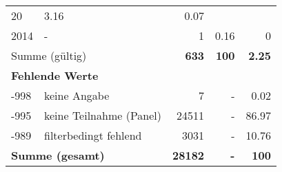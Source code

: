 \begin{longtable}{lXrrr}
       \num{20} &
       \num[round-mode=places,round-precision=2]{3.16} &
         \num[round-mode=places,round-precision=2]{0.07} \\

     2014 &
     \multicolumn{1}{X}{ -  } &


       \num{1} &
       \num[round-mode=places,round-precision=2]{0.16} &
         \num[round-mode=places,round-precision=2]{0} \\
     \midrule
     \multicolumn{2}{l}{Summe (gültig)} &
       \textbf{\num{633}} &
     \textbf{\num{100}} &
       \textbf{\num[round-mode=places,round-precision=2]{2.25}} \\
     \multicolumn{5}{l}{\textbf{Fehlende Werte}}\\
       -998 &
       keine Angabe &
         \num{7} &
        - &
         \num[round-mode=places,round-precision=2]{0.02} \\
       -995 &
       keine Teilnahme (Panel) &
         \num{24511} &
        - &
         \num[round-mode=places,round-precision=2]{86.97} \\
       -989 &
       filterbedingt fehlend &
         \num{3031} &
        - &
         \num[round-mode=places,round-precision=2]{10.76} \\
     \midrule
     \multicolumn{2}{l}{\textbf{Summe (gesamt)}} &
          \textbf{\num{28182}} &
        \textbf{-} &
        \textbf{\num{100}} \\
     \bottomrule
     \end{longtable}
     
